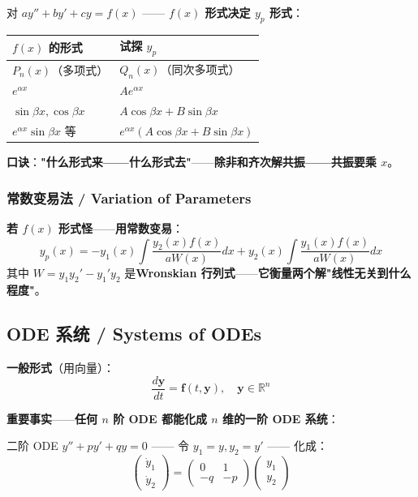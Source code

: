 对 $a y'' + b y' + c y = f(x)$ —— \textbf{$f(x)$ 形式决定 $y_p$ 形式}：

\begin{center}
\begin{tabular}{ll}
\toprule
\textbf{$f(x)$ 的形式} & \textbf{试探 $y_p$} \\
\midrule
$P_n(x)$（多项式） & $Q_n(x)$（同次多项式） \\
$e^{\alpha x}$ & $A e^{\alpha x}$ \\
$\sin\beta x, \cos\beta x$ & $A\cos\beta x + B\sin\beta x$ \\
$e^{\alpha x}\sin\beta x$ 等 & $e^{\alpha x}(A\cos\beta x + B\sin\beta x)$ \\
\bottomrule
\end{tabular}
\end{center}

\textbf{口诀}：\textbf{"什么形式来——什么形式去"}——\textbf{除非和齐次解共振——共振要乘 $x$}。

\subsubsection{常数变易法 / Variation of Parameters}

\textbf{若 $f(x)$ 形式怪}——\textbf{用常数变易}：
\[
y_p(x) = -y_1(x) \int \frac{y_2(x) f(x)}{a W(x)} dx + y_2(x) \int \frac{y_1(x) f(x)}{a W(x)} dx
\]
其中 $W = y_1 y_2' - y_1' y_2$ 是\textbf{Wronskian 行列式}——\textbf{它衡量两个解"线性无关到什么程度"}。

\subsection{ODE 系统 / Systems of ODEs}

\textbf{一般形式}（用向量）：
\[
\frac{d\bm{y}}{dt} = \bm{f}(t, \bm{y}), \quad \bm{y} \in \mathbb{R}^n
\]

\textbf{重要事实}——\textbf{任何 $n$ 阶 ODE 都能化成 $n$ 维的一阶 ODE 系统}：

二阶 ODE $y'' + p y' + q y = 0$ —— 令 $y_1 = y, y_2 = y'$ —— 化成：
\[
\begin{pmatrix} \dot y_1 \\ \dot y_2 \end{pmatrix} = \begin{pmatrix} 0 & 1 \\ -q & -p \end{pmatrix} \begin{pmatrix} y_1 \\ y_2 \end{pmatrix}
\]

